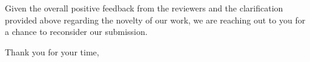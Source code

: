 \begin{flushleft}
    Given the overall positive feedback from the reviewers and the clarification provided above regarding the novelty of our work, we are reaching out to you for a chance to reconsider our submission.

    Thank you for your time,\\[1em]%
    \theauthor
\end{flushleft}
\newpage